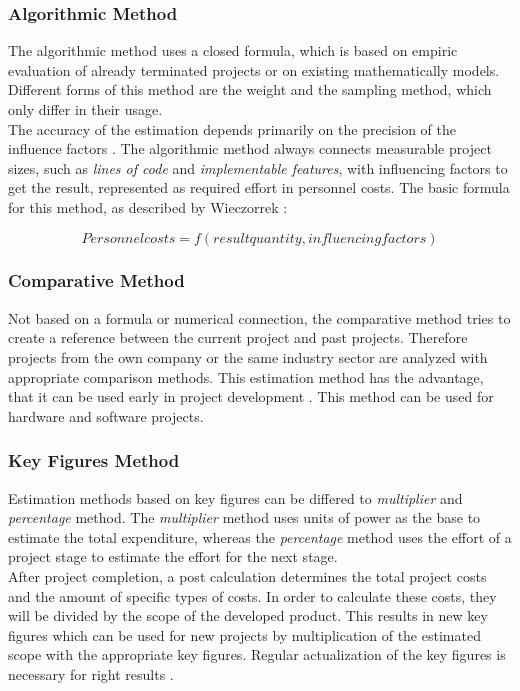 \subsubsection{Algorithmic Method}

The algorithmic method uses a closed formula, which is based on empiric evaluation of already terminated projects or on existing mathematically models. Different forms of this method are the weight and the sampling method, which only differ in their usage.\\
The accuracy of the estimation depends primarily on the precision of the influence factors \cite{itplanung}. The algorithmic method always connects measurable project sizes, such as \textit{lines of code} and \textit{implementable features}, with influencing factors to get the result, represented as required effort in personnel costs. The basic formula for this method, as described by Wieczorrek \cite{itplanung}:

\begin{equation}
	Personnel costs = f(result quantity, influencing factors)
\end{equation}

\subsubsection{Comparative Method}

Not based on a formula or numerical connection, the comparative method tries to create a reference between the current project and past projects. Therefore projects from the own company or the same industry sector are analyzed with appropriate comparison methods. This estimation method has the advantage, that it can be used early in project development \cite{itplanung}. This method can be used for hardware and software projects.

\subsubsection{Key Figures Method}

Estimation methods based on key figures can be differed to \textit{multiplier} and \textit{percentage}  method. The \textit{multiplier} method uses units of power as the base to estimate the total expenditure, whereas the \textit{percentage} method uses the effort of a project stage to estimate the effort for the next stage.\\
After project completion, a post calculation determines the total project costs and the amount of specific types of costs. In order to calculate these costs, they will be divided by the scope of the developed product. This results in new key figures which can be used for new projects by multiplication of the estimated scope with the appropriate key figures. Regular actualization of the key figures is necessary for right results \cite{itplanung}.\\

